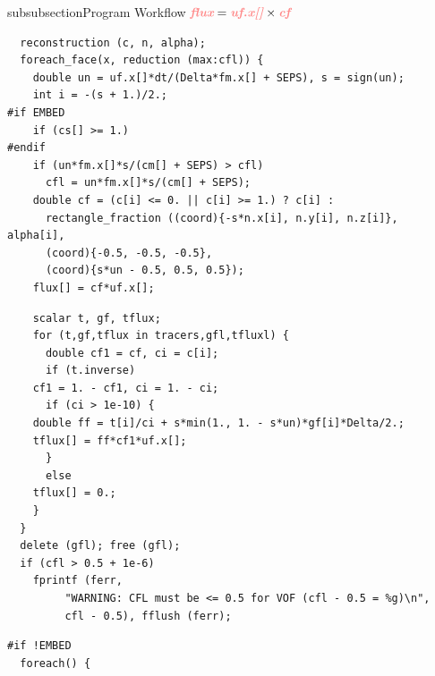 \begin{codesection}{subsubsection}{Program Workflow}
{  $\para{flux}=\para{uf.x[]}\times \para{cf}$
}
\begin{verbatim}
  reconstruction (c, n, alpha);
  foreach_face(x, reduction (max:cfl)) {
    double un = uf.x[]*dt/(Delta*fm.x[] + SEPS), s = sign(un);
    int i = -(s + 1.)/2.;
#if EMBED
    if (cs[] >= 1.)
#endif
    if (un*fm.x[]*s/(cm[] + SEPS) > cfl)
      cfl = un*fm.x[]*s/(cm[] + SEPS);
    double cf = (c[i] <= 0. || c[i] >= 1.) ? c[i] :
      rectangle_fraction ((coord){-s*n.x[i], n.y[i], n.z[i]}, alpha[i],
      (coord){-0.5, -0.5, -0.5},
      (coord){s*un - 0.5, 0.5, 0.5});
    flux[] = cf*uf.x[];
\end{verbatim}
\codearrow
{}
\begin{verbatim}
    scalar t, gf, tflux;
    for (t,gf,tflux in tracers,gfl,tfluxl) {
      double cf1 = cf, ci = c[i];
      if (t.inverse)
	cf1 = 1. - cf1, ci = 1. - ci;
      if (ci > 1e-10) {
	double ff = t[i]/ci + s*min(1., 1. - s*un)*gf[i]*Delta/2.;
	tflux[] = ff*cf1*uf.x[];
      }
      else
	tflux[] = 0.;
    }
  }
  delete (gfl); free (gfl);
  if (cfl > 0.5 + 1e-6)
    fprintf (ferr, 
	     "WARNING: CFL must be <= 0.5 for VOF (cfl - 0.5 = %g)\n", 
	     cfl - 0.5), fflush (ferr);
\end{verbatim}
\codearrow
{}
\begin{verbatim}
#if !EMBED
  foreach() {

\end{verbatim}
\end{codesection}
